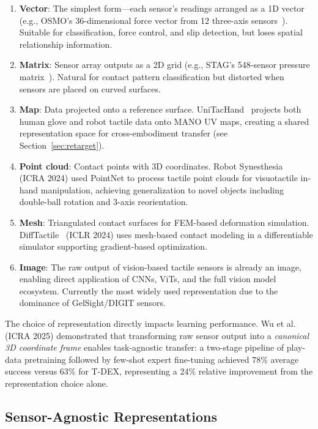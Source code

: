 \begin{enumerate}
    \item \textbf{Vector}: The simplest form---each sensor's readings arranged as a 1D vector (e.g., OSMO's 36-dimensional force vector from 12 three-axis sensors~\cite{yin2025osmo}). Suitable for classification, force control, and slip detection, but loses spatial relationship information.
    \item \textbf{Matrix}: Sensor array outputs as a 2D grid (e.g., STAG's 548-sensor pressure matrix~\cite{sundaram2019stag}). Natural for contact pattern classification but distorted when sensors are placed on curved surfaces.
    \item \textbf{Map}: Data projected onto a reference surface. UniTacHand~\cite{zhang2025unitachand} projects both human glove and robot tactile data onto MANO UV maps, creating a shared representation space for cross-embodiment transfer (see Section~\ref{sec:retarget}).
    \item \textbf{Point cloud}: Contact points with 3D coordinates. Robot Synesthesia~\cite{yuan2024synesthesia} (ICRA 2024) used PointNet to process tactile point clouds for visuotactile in-hand manipulation, achieving generalization to novel objects including double-ball rotation and 3-axis reorientation.
    \item \textbf{Mesh}: Triangulated contact surfaces for FEM-based deformation simulation. DiffTactile~\cite{si2024difftactile} (ICLR 2024) uses mesh-based contact modeling in a differentiable simulator supporting gradient-based optimization.
    \item \textbf{Image}: The raw output of vision-based tactile sensors is already an image, enabling direct application of CNNs, ViTs, and the full vision model ecosystem. Currently the most widely used representation due to the dominance of GelSight/DIGIT sensors.
\end{enumerate}

The choice of representation directly impacts learning performance. Wu et al.~\cite{wu2025canonical} (ICRA 2025) demonstrated that transforming raw sensor output into a \emph{canonical 3D coordinate frame} enables task-agnostic transfer: a two-stage pipeline of play-data pretraining followed by few-shot expert fine-tuning achieved 78\% average success versus 63\% for T-DEX, representing a 24\% relative improvement from the representation choice alone.

\subsection{Sensor-Agnostic Representations}

